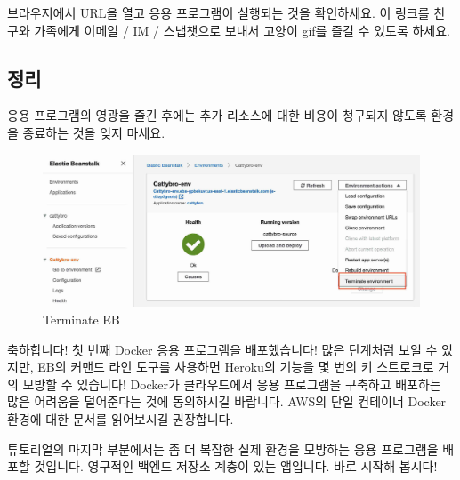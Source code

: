 브라우저에서 URL을 열고 응용 프로그램이 실행되는 것을 확인하세요. 이 링크를 친구와 가족에게 이메일 / IM / 스냅챗으로 보내서 고양이 gif를 즐길 수 있도록 하세요.

\subsection{정리}
응용 프로그램의 영광을 즐긴 후에는 추가 리소스에 대한 비용이 청구되지 않도록 환경을 종료하는 것을 잊지 마세요.

\begin{figure}
\includegraphics[width=\textwidth]{images/eb-terminate.jpg}
\caption{Terminate EB}
\end{figure}


축하합니다! 첫 번째 Docker 응용 프로그램을 배포했습니다! 많은 단계처럼 보일 수 있지만, EB의 커맨드 라인 도구를 사용하면 Heroku의 기능을 몇 번의 키 스트로크로 거의 모방할 수 있습니다! Docker가 클라우드에서 응용 프로그램을 구축하고 배포하는 많은 어려움을 덜어준다는 것에 동의하시길 바랍니다. AWS의 단일 컨테이너 Docker 환경에 대한 문서를 읽어보시길 권장합니다.

튜토리얼의 마지막 부분에서는 좀 더 복잡한 실제 환경을 모방하는 응용 프로그램을 배포할 것입니다. 영구적인 백엔드 저장소 계층이 있는 앱입니다. 바로 시작해 봅시다!